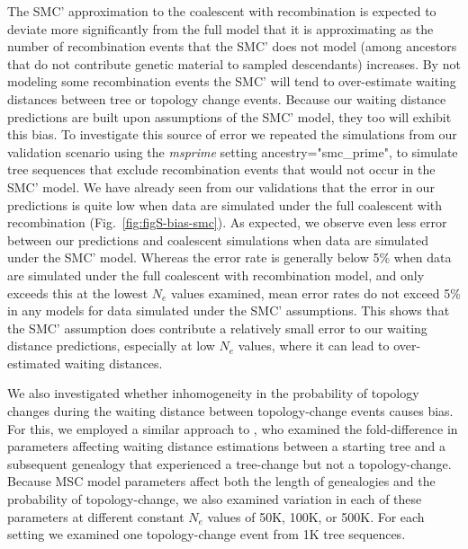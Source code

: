 \documentclass[11pt]{article}
\begin{document}
The SMC' approximation to the coalescent with recombination is expected 
to deviate more significantly from the full model that it is approximating 
as the number of recombination events that the SMC' does not model 
(among ancestors that do not contribute genetic material to sampled descendants) 
increases. 
By not modeling some recombination events the SMC' will tend to 
over-estimate waiting distances between tree or topology change events. 
Because our waiting distance predictions are built upon assumptions of 
the SMC' model, they too will exhibit this bias. 
To investigate this source of error we repeated the simulations from our 
validation scenario using the \emph{msprime} setting ancestry="smc\_prime",
to simulate tree sequences that exclude recombination events that would 
not occur in the SMC' model. 
We have already seen from our validations that the error in our predictions 
is quite low when data are simulated under the full coalescent with 
recombination (Fig.~\ref{fig:figS-bias-smc}). %
As expected, we observe even less error 
between our predictions and coalescent simulations when data are simulated
under the SMC' model. Whereas the error 
rate is generally below 5\% when data are simulated under the full coalescent
with recombination model, and only exceeds this at the lowest
$N_e$ values examined, mean error rates do not exceed 5\% in any 
models for data simulated under the SMC' assumptions. 
This shows that the SMC' assumption does contribute a relatively small error 
to our waiting distance predictions, especially at low $N_e$ values,
where it can lead to over-estimated waiting distances.

We also investigated whether inhomogeneity in the probability of topology 
changes during the waiting distance between topology-change events 
causes bias. 
For this, we employed a similar approach to \citet{deng_distribution_2021}, 
who examined the fold-difference in parameters affecting waiting distance
estimations between a starting tree and a subsequent genealogy that 
experienced a tree-change but not a topology-change. 
Because MSC model parameters affect both the length of genealogies and
the probability of topology-change, we also examined variation in each of these 
parameters at different constant $N_e$ values of 50K, 100K, or 500K. 
For each setting we examined one topology-change event from 1K tree sequences. 
\end{document}
